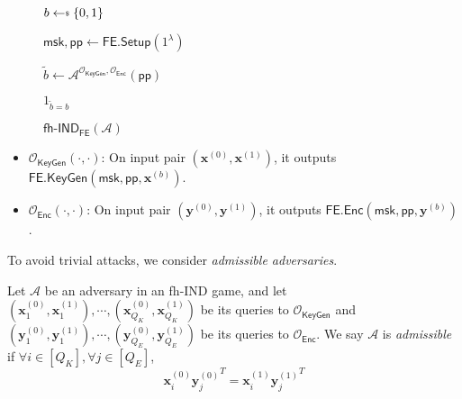 \begin{figure}[h]
\centering

	\begin{minipage}[t]{0.4\textwidth}
	\begin{algorithm}[H]
	\caption{$\textsf{fh-IND}_{\textsf{FE}}(\mathcal{A})$}
	\label{alg:ind-fh-IPFE}
	\begin{algorithmic}[1]
		\State $b \getsdollar \{0, 1\}$

		\State $\textsf{msk}, \textsf{pp} \gets \textsf{FE.Setup}(1^\lambda)$

		\State $\tilde{b} \gets \mathcal{A}^{\mathcal{O}_{\textsf{KeyGen}}, \mathcal{O}_{\textsf{Enc}}} ( \textsf{pp} )$

		\State \Return $1_{\tilde{b} = b}$
	\end{algorithmic}
	\end{algorithm}
	\end{minipage}

\label{fig:ind-fh-IPFE}
\end{figure}

\begin{itemize}

	\item $\mathcal{O}_{\textsf{KeyGen}}(\cdot, \cdot)$: On input pair $(\mathbf{x}^{(0)}, \mathbf{x}^{(1)})$, it outputs $\textsf{FE.KeyGen}(\textsf{msk}, \textsf{pp}, \mathbf{x}^{(b)} )$.

	\item $\mathcal{O}_{\textsf{Enc}}(\cdot, \cdot)$: On input pair $(\mathbf{y}^{(0)}, \mathbf{y}^{(1)})$, it outputs $\textsf{FE.Enc}(\textsf{msk}, \textsf{pp}, \mathbf{y}^{(b)} )$.

\end{itemize}

\noindent To avoid trivial attacks, we consider \emph{admissible adversaries}.

\begin{definition}

	Let $\mathcal{A}$ be an adversary in an \textsf{fh-IND} game, and let $ (\mathbf{x}_1^{(0)}, \mathbf{x}_1^{(1)}), \cdots, (\mathbf{x}_{Q_K}^{(0)}, \mathbf{x}_{Q_K}^{(1)})$ be its queries to $\mathcal{O}_{\textsf{KeyGen}}$ and $(\mathbf{y}_1^{(0)}, \mathbf{y}_1^{(1)}), \cdots, (\mathbf{y}_{Q_E}^{(0)}, \mathbf{y}_{Q_E}^{(1)})$ be its queries to $\mathcal{O}_{\textsf{Enc}}$.
	We say $\mathcal{A}$ is \emph{admissible} if $\forall i \in [Q_K], \forall j \in [Q_E]$,
\[
	{\mathbf{x}^{(0)}_{i}} {\mathbf{y}^{(0)}_{j}}^T = {\mathbf{x}^{(1)}_{i}} {\mathbf{y}^{(1)}_{j}}^T
\]

\end{definition}


